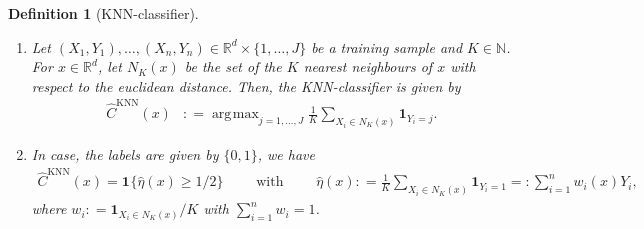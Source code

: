 \documentclass[a4paper,11pt]{article} %
\numberwithin{equation}{section}
\DeclareMathOperator*{\argmax}{arg\!\max}
\theoremstyle{ndefinition}
\newtheorem{defi}{Definition}[section]
\theoremstyle{nremark}
\theoremstyle{nplain}
\begin{document}
\begin{defi}[KNN-classifier]%
  \label{def:KNNClassifier}
  \
  \begin{enumerate}[label=(\alph*)]
    \item Let \( ( X_{1}, Y_{1} ), \dots, ( X_{n}, Y_{n} ) \in \mathbb{R}^{d}
      \times \{ 1, \dots, J \} \) be a training sample and \( K \in \mathbb{N}
      \). For \( x \in \mathbb{R}^{d} \), let \( N_{K}(x) \) be the set of the
      \( K \) nearest neighbours of \( x \) with respect to the euclidean
      distance. Then, the KNN-classifier is given by
      \begin{align*}
        \hat C^{\text{KNN}}(x) 
        & : = \argmax_{j = 1, \dots, J} 
        \frac{1}{K} \sum_{X_{i} \in N_{K}(x)} \mathbf{1}_{Y_{i} = j}.  
      \end{align*}
    \item In case, the labels are given by \( \{ 0, 1 \} \), we have
      \begin{align*}
        \hat C^{\text{KNN}}(x) 
        = \mathbf{1}_{} \{ \hat \eta(x) \ge 1 / 2 \} 
        \qquad \text{ with } \qquad 
        \hat \eta(x) 
        : = \frac{1}{K} \sum_{X_{i} \in N_{K}(x)} \mathbf{1}_{Y_{i} = 1} 
        = : \sum_{i = 1}^{n} w_{i}(x) Y_{i},
      \end{align*}
      where \( w_{i} : = \mathbf{1}_{X_{i} \in N_{K}(x)} / K  \) with \( \sum_{i
      = 1}^{n} w_{i} = 1 \). 
  \end{enumerate}
\end{defi}%
\end{document}
